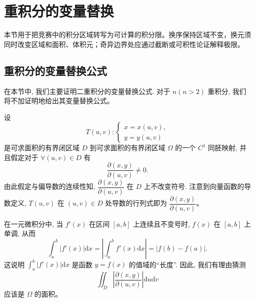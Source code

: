 \documentclass[UTF8,12pt,a4paper,fontset=fandol]{ctexart}
\begin{document}
\section{重积分的变量替换}\label{course-15-4}
本节用于把竞赛中的积分区域转写为可计算的积分限。换序保持区域不变，换元须同时改变区域和面积、体积元；奇异边界处应通过截断或可积性论证解释极限。

\subsection{重积分的变量替换公式}

在本节中, 我们主要证明二重积分的变量替换公式. 对于 $n(n>2)$ 重积分, 我们将不加证明地给出其变量替换公式。

设
\[
  T(u,v):
  \begin{cases}
    x=x(u,v),\\
    y=y(u,v)
  \end{cases}
\]
是可求面积的有界闭区域 $D$ 到可求面积的有界闭区域 $\Omega$ 的一个 $C^1$ 同胚映射, 并且假定对于 $\forall(u,v)\in D$ 有
\[
  \frac{\partial(x,y)}{\partial(u,v)}\ne0.
\]
由此假定与偏导数的连续性知, $\dfrac{\partial(x,y)}{\partial(u,v)}$ 在 $D$ 上不改变符号. 注意到向量函数的导数定义, $T(u,v)$ 在 $(u,v)\in D$ 处导数的行列式即为 $\dfrac{\partial(x,y)}{\partial(u,v)}$。

在一元微积分中, 当 $f'(x)$ 在区间 $[a,b]$ 上连续且不变号时, $f(x)$ 在 $[a,b]$ 上单调, 从而
\[
  \int_a^b|f'(x)|\mathrm dx
  =\left|\int_a^bf'(x)\mathrm dx\right|
  =|f(b)-f(a)|.
\]
这说明 $\int_a^b|f'(x)|\mathrm dx$ 是函数 $y=f(x)$ 的值域的“长度”. 因此, 我们有理由猜测
\[
  \iint_D\left|\frac{\partial(x,y)}{\partial(u,v)}\right|\mathrm du\mathrm dv
\]
应该是 $\Omega$ 的面积。
\end{document}

